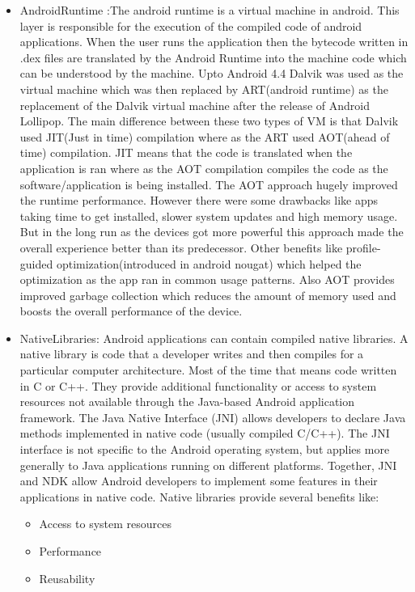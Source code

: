 \documentclass[conference]{IEEEtran}
\begin{document}
\begin{itemize}
\linebreak
\item{Android\;Runtime} :\linebreak The android runtime is a virtual machine in android. This layer is responsible for the execution of the compiled code of android applications. When the user runs the application then the bytecode written in .dex files are translated by the Android Runtime into the machine code which can be understood by the machine. Upto Android 4.4 Dalvik was used as the virtual machine which was then replaced by ART(android runtime) as the replacement of the Dalvik virtual machine after the release of Android Lollipop. The main difference between these two types of VM is that Dalvik used JIT(Just in time) compilation where as the ART used AOT(ahead of time) compilation. JIT means that the code is translated when the application is ran where as the AOT compilation compiles the code as the software/application is being installed. The AOT approach hugely improved the runtime performance. However there were some drawbacks like apps taking time to get installed, slower system updates and high memory usage. But in the long run as the devices got more powerful this approach made the overall experience better than its predecessor. Other benefits like profile-guided optimization(introduced in android nougat) which helped the optimization as the app ran in common usage patterns. Also AOT provides improved garbage collection which reduces the amount of memory used and boosts the overall performance of the device. 
\linebreak
\item Native\;Libraries: \linebreak Android applications can contain compiled native libraries. A native library is code that a developer writes and then compiles for a particular computer architecture. Most of the time that means code written in C or C++. They provide additional functionality or access to system resources not available through the Java-based Android application framework. The Java Native Interface (JNI) allows developers to declare Java methods implemented in native code (usually compiled C/C++). The JNI interface is not specific to the Android operating system, but applies more generally to Java applications running on different platforms. Together, JNI and NDK allow Android developers to implement some features in their applications in native code. Native libraries provide several benefits like:

\begin{itemize}
    \item Access to system resources
    \item Performance
    \item Reusability
\end{itemize}


\end{itemize}
\end{document}
